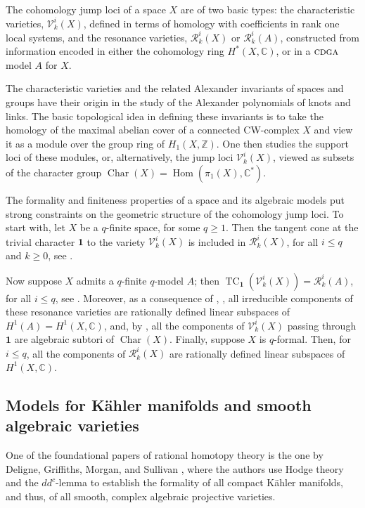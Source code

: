 \documentclass{article}
\numberwithin{equation}{section}
\theoremstyle{definition}
\newcommand{\Z}{\mathbb{Z}}
\renewcommand{\C}{\mathbb{C}}
\newcommand{\VV}{\mathcal{V}}
\newcommand{\RR}{\mathcal{R}}
\newcommand{\cdga}{\ensuremath{\textsc{cdga}}}
\DeclareMathOperator{\Hom}{{Hom}}
\DeclareMathOperator{\TC}{TC}
\DeclareMathOperator{\Char}{Char}
\newcommand{\one}{\mathbf{1}}
\begin{document}
The cohomology jump loci of a space $X$ are of two 
basic types: the characteristic varieties, $\VV^i_k(X)$, 
defined in terms of homology with coefficients in rank 
one local systems, and the resonance varieties, $\RR^i_k(X)$ 
or $\RR^i_k(A)$, constructed from information encoded in either 
the cohomology ring $H^*(X,\C)$, or in a $\cdga$ model $A$ for $X$. 

The characteristic varieties and the related Alexander invariants of 
spaces and groups have their origin in the study of the Alexander 
polynomials of knots and links.  The basic topological idea in defining 
these invariants is to take the homology of the maximal abelian cover 
of a connected CW-complex $X$ and view it as a module over the group ring 
of $H_1(X,\Z)$. One then studies the support loci of these modules, 
or, alternatively, the jump loci $\VV^i_k(X)$, viewed as subsets of 
the character group $\Char(X)=\Hom(\pi_1(X),\C^*)$. 

The formality and finiteness properties of a space and its algebraic 
models put strong constraints on the geometric structure of the 
cohomology jump loci. To start with, let $X$ be a $q$-finite space, 
for some $q\ge 1$. Then the tangent cone at the trivial character 
$\one$ to the variety $\VV^i_k(X)$ is included in $\RR^i_k(X)$, 
for all $i\le q$ and $k\ge 0$, see \cite{Li02}.  

Now suppose $X$ admits a $q$-finite $q$-model $A$; 
then $\TC_{\one}(\VV^i_k(X))=\RR^i_k(A)$, for all $i\le q$, 
see \cite{DP-ccm}. Moreover, as a consequence of \cite{DPS-duke}, 
\cite{DP-ccm}, all irreducible components of these resonance 
varieties are rationally defined 
linear subspaces of $H^1(A)=H^1(X,\C)$, and, by \cite{BW20}, 
all the components of $\VV^i_k(X)$ passing through 
$\one$ are algebraic subtori of $\Char(X)$.
Finally, suppose $X$ is $q$-formal.  Then, for $i\le q$,   
all the components of $\RR^i_k(X)$ are rationally defined 
linear subspaces of $H^1(X,\C)$.

\subsection{Models for K\"{a}hler manifolds and smooth algebraic varieties}
\label{subsec:intro-algmod1}

One of the foundational papers of rational homotopy theory is the one 
by Deligne, Griffiths, Morgan, and Sullivan \cite{DGMS}, where the authors 
use Hodge theory and the $dd^{c}$-lemma to establish the formality of 
all compact K\"{a}hler manifolds, and thus, of all smooth, complex algebraic 
projective varieties.
\end{document}
